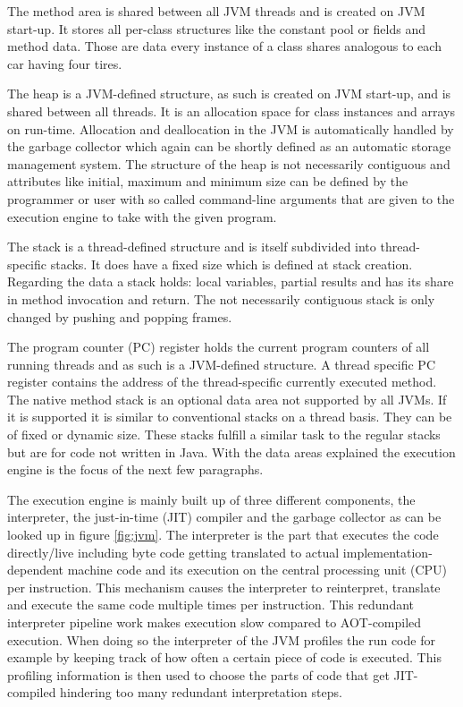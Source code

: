 The method area is shared between all JVM threads and is created on JVM start-up. It stores all per-class structures like the constant pool or fields and method data. Those are data every instance of a class shares analogous to each car having four tires.

The heap is a JVM-defined structure, as such is created on JVM start-up, and is shared between all threads. It is an allocation space for class instances and arrays on run-time. Allocation and deallocation in the JVM is automatically handled by the garbage collector which again can be shortly defined as an automatic storage management system. The structure of the heap is not necessarily contiguous and attributes like initial, maximum and minimum size can be defined by the programmer or user with so called command-line arguments that are given to the execution engine to take with the given program.

The stack is a thread-defined structure and is itself subdivided into thread-specific stacks. It does have a fixed size which is defined at stack creation. Regarding the data a stack holds: local variables, partial results and has its share in method invocation and return. The not necessarily contiguous stack is only changed by pushing and popping frames.

The program counter (PC) register holds the current program counters of all running threads and as such is a JVM-defined structure. A thread specific PC register contains the address of the thread-specific currently executed method.
The native method stack is an optional data area not supported by all JVMs. If it is supported it is similar to conventional stacks on a thread basis. They can be of fixed or dynamic size. These stacks fulfill a similar task to the regular stacks but are for code not written in Java. With the data areas explained the execution engine is the focus of the next few paragraphs.

The execution engine is mainly built up of three different components, the interpreter, the just-in-time (JIT) compiler and the garbage collector as can be looked up in figure \ref{fig:jvm}. The interpreter is the part that executes the code directly/live including byte code getting translated to actual implementation-dependent machine code and its execution on the central processing unit (CPU) per instruction. This mechanism causes the interpreter to reinterpret, translate and execute the same code multiple times per instruction. This redundant interpreter pipeline work makes execution slow compared to AOT-compiled execution. When doing so the interpreter of the JVM profiles the run code for example by keeping track of how often a certain piece of code is executed. This profiling information is then used to choose the parts of code that get JIT-compiled hindering too many redundant interpretation steps.

